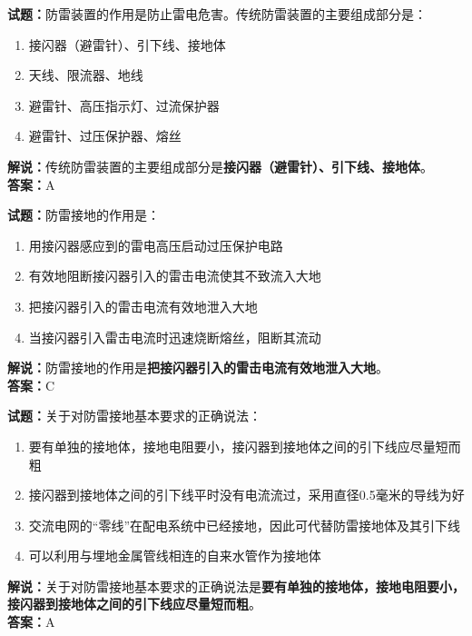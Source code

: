 \documentclass{ctexbook}
\begin{document}
\bigskip



\noindent\textbf{试题：}防雷装置的作用是防止雷电危害。传统防雷装置的主要组成部分是：
\begin{enumerate}[leftmargin=3em]
	\item 接闪器（避雷针）、引下线、接地体
	\item 天线、限流器、地线
	\item 避雷针、高压指示灯、过流保护器
	\item 避雷针、过压保护器、熔丝
\end{enumerate}
\noindent\textbf{解说：}传统防雷装置的主要组成部分是\textbf{接闪器（避雷针）、引下线、接地体}。\\\noindent\textbf{答案：}A


\bigskip



\noindent\textbf{试题：}防雷接地的作用是：
\begin{enumerate}[leftmargin=3em]
	\item 用接闪器感应到的雷电高压启动过压保护电路
	\item 有效地阻断接闪器引入的雷击电流使其不致流入大地
	\item 把接闪器引入的雷击电流有效地泄入大地
	\item 当接闪器引入雷击电流时迅速烧断熔丝，阻断其流动
\end{enumerate}
\noindent\textbf{解说：}防雷接地的作用是\textbf{把接闪器引入的雷击电流有效地泄入大地}。\\\noindent\textbf{答案：}C


\bigskip



\noindent\textbf{试题：}关于对防雷接地基本要求的正确说法：
\begin{enumerate}[leftmargin=3em]
	\item 要有单独的接地体，接地电阻要小，接闪器到接地体之间的引下线应尽量短而粗
	\item 接闪器到接地体之间的引下线平时没有电流流过，采用直径0.5毫米的导线为好
	\item 交流电网的“零线”在配电系统中已经接地，因此可代替防雷接地体及其引下线
	\item 可以利用与埋地金属管线相连的自来水管作为接地体
\end{enumerate}
\noindent\textbf{解说：}关于对防雷接地基本要求的正确说法是\textbf{要有单独的接地体，接地电阻要小，接闪器到接地体之间的引下线应尽量短而粗}。\\\noindent\textbf{答案：}A
\end{document}
